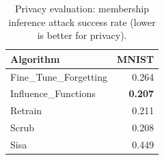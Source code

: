 \begin{table}[t]
\centering
\caption{Privacy evaluation: membership inference attack success rate (lower is better for privacy).}
\label{tab:privacy}
\small
\begin{tabular}{lr}
\toprule
Algorithm & MNIST \\
\midrule
Fine\_Tune\_Forgetting & 0.264 \\
Influence\_Functions & \textbf{0.207} \\
Retrain & 0.211 \\
Scrub & 0.208 \\
Sisa & 0.449 \\
\bottomrule
\end{tabular}
\end{table}